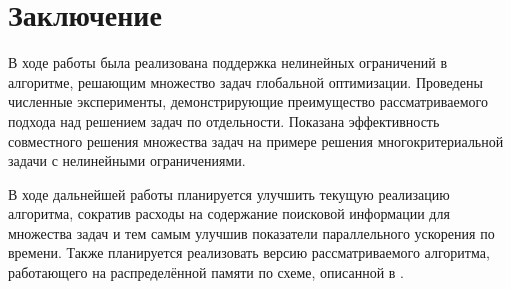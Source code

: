 \documentclass[11pt, oneside, a4paper]{article}
\begin{document}
\section{Заключение}

В ходе работы была реализована поддержка нелинейных ограничений в алгоритме, решающим
множество задач глобальной оптимизации. Проведены численные эксперименты, демонстрирующие
преимущество рассматриваемого подхода над решением задач по отдельности. Показана эффективность
совместного решения множества задач на примере решения многокритериальной задачи с
нелинейными ограничениями.

В ходе дальнейшей работы планируется улучшить текущую реализацию алгоритма,
сократив расходы на содержание поисковой информации для множества задач и тем самым улучшив
показатели параллельного ускорения по времени. Также планируется реализовать версию
рассматриваемого алгоритма, работающего на распределённой памяти по схеме, описанной в \cite{BarkalovLebedev2017}.


{}
\end{document}
